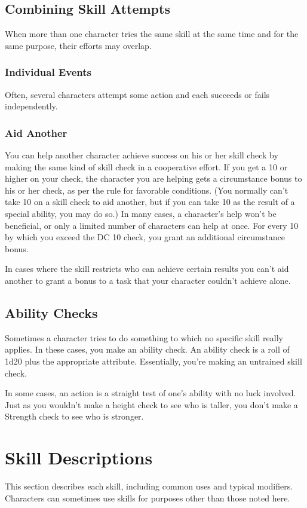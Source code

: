 \subsection{Combining Skill Attempts}
When more than one character tries the same skill at the same time
and for the same purpose, their efforts may overlap.

\subsubsection{Individual Events}
Often, several characters attempt some action and each succeeds or
fails independently.

\subsubsection{Aid Another}
You can help another character achieve success on his or her skill check by making the same kind of skill check in a cooperative effort. If you get a 10 or higher on your check, the character you are helping gets a  circumstance bonus to his or her check, as per the rule for favorable conditions. (You normally can't take 10 on a skill check to aid another, but if you can take 10 as the result of a special ability, you may do so.) In many cases, a character's help won't be beneficial, or only a limited number of characters can help at once. For every 10 by which you exceed the DC 10 check, you grant an additional  circumstance bonus.

In cases where the skill restricts who can achieve certain results you can't aid another to grant a bonus to a task that your character couldn't achieve alone.

\subsection{Ability Checks}
Sometimes a character tries to do something to which no specific skill really applies. In these cases, you make an ability check. An ability check is a roll of 1d20 plus the appropriate attribute. Essentially, you're making an untrained skill check.

In some cases, an action is a straight test of one's ability with no luck involved. Just as you wouldn't make a height check to see who is taller, you don't make a Strength check to see who is stronger.

\section{Skill Descriptions}
This section describes each skill, including common uses and typical modifiers. Characters can sometimes use skills for purposes other than those noted here.

